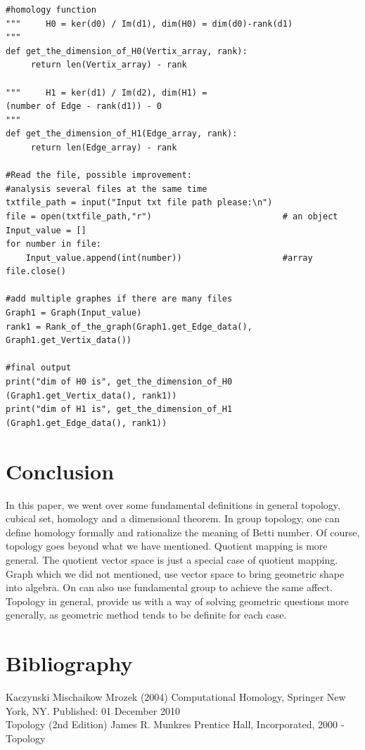 \documentclass[12pt,letterpaper]{article}
\begin{document}
\begin{normalsize}
\begin{verbatim}
#homology function 
"""     H0 = ker(d0) / Im(d1), dim(H0) = dim(d0)-rank(d1)  
"""
def get_the_dimension_of_H0(Vertix_array, rank):
     return len(Vertix_array) - rank

"""     H1 = ker(d1) / Im(d2), dim(H1) =
(number of Edge - rank(d1)) - 0
"""
def get_the_dimension_of_H1(Edge_array, rank):
     return len(Edge_array) - rank

#Read the file, possible improvement:
#analysis several files at the same time
txtfile_path = input("Input txt file path please:\n")
file = open(txtfile_path,"r")                          # an object
Input_value = []
for number in file:
    Input_value.append(int(number))                    #array
file.close()

#add multiple graphes if there are many files
Graph1 = Graph(Input_value)
rank1 = Rank_of_the_graph(Graph1.get_Edge_data(),
Graph1.get_Vertix_data())

#final output
print("dim of H0 is", get_the_dimension_of_H0
(Graph1.get_Vertix_data(), rank1))
print("dim of H1 is", get_the_dimension_of_H1
(Graph1.get_Edge_data(), rank1))
\end{verbatim}
\section{Conclusion}
\hspace{5mm} In this paper, we went over some fundamental definitions in general topology, cubical set, homology and a dimensional theorem. In group topology, one can define homology formally and rationalize the meaning of Betti number. Of course, topology goes beyond what we have mentioned. Quotient mapping is more general. The quotient vector space is just a special case of quotient mapping. Graph which we did not mentioned, use vector space to bring geometric shape into algebra. On can also use fundamental group to achieve the same affect. Topology in general, provide us with a way of solving geometric questions more generally, as geometric method tends to be definite for each case.
\section{Bibliography}
Kaczynski Mischaikow Mrozek (2004) Computational Homology, Springer New York, NY. Published: 01 December 2010 \\[20pt]
Topology (2nd Edition) James R. Munkres Prentice Hall, Incorporated, 2000 - Topology

\newpage
\end{normalsize}
\end{document}
